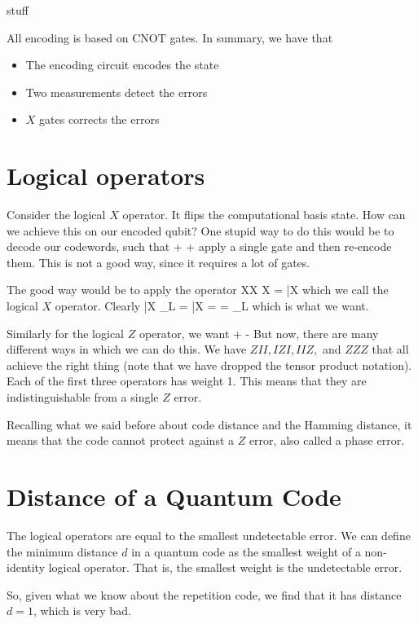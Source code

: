 stuff

All encoding is based on CNOT gates. In summary, we have that 
\begin{itemize}
\item The encoding circuit encodes the state
\item Two measurements detect the errors 
\item $X$ gates corrects the errors
\end{itemize}

\section{Logical operators}
Consider the logical $X$ operator. It flips the computational basis state. How can we achieve this on our encoded qubit? One stupid way to do this would be to decode our codewords, such that 
\beq
\alpha {} + \beta {} \rightarrow \alpha {} + \beta {}
\eeq
apply a single gate and then re-encode them. This is not a good way, since it requires a lot of gates. 

The good way would be to apply the operator
\beq
X\otimes X \otimes X = \bar{X}
\eeq
which we call the logical $X$ operator.  Clearly
\beq
\bar{X} _L = \bar{X}  =  = _L
\eeq
which is what we want. 

Similarly for the logical $Z$ operator, we want
\beq
\alpha {} + \beta {} \rightarrow \alpha {} - \beta {}
\eeq
But now, there are many different ways in which we can do this. We have $ZII, IZI, IIZ, $ and $ZZZ$ that all achieve the right thing (note that we have dropped the tensor product notation). Each of the first three operators has weight 1. This means that they are indistinguishable from a single $Z$ error. 

Recalling what we said before about code distance and the Hamming distance, it means that the code cannot protect against a $Z$ error, also called a phase error. 

\section{Distance of a Quantum Code}
The logical operators are equal to the smallest undetectable error. We can define the minimum distance $d$ in a quantum code as the smallest weight of a non-identity logical operator. That is, the smallest weight is the undetectable error. 

So, given what we know about the repetition code, we find that it has distance $d = 1$, which is very bad. 

